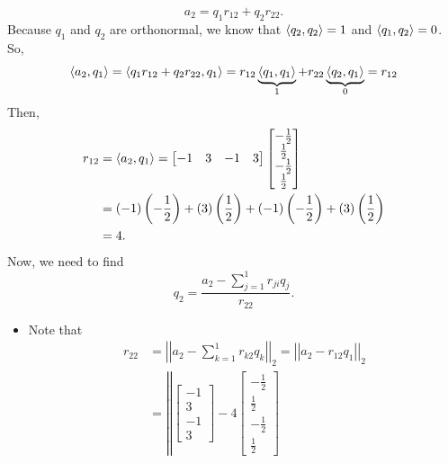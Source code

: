 \documentclass[letterpaper]{article}
\begin{document}
\begin{mdframed}
    \begin{mdframed}
        \[a_2 = q_1 r_{12} + q_2 r_{22}.\]
        Because $q_1$ and $q_2$ are orthonormal, we know that $\langle q_2, q_2 \rangle = 1$ and $\langle q_1, q_2 \rangle = 0$. So, \[\langle a_2, q_1 \rangle = \langle q_1 r_{12} + q_2 r_{22}, q_1 \rangle = r_{12} \underbrace{\langle q_1, q_1 \rangle}_{1} + r_{22} \underbrace{\langle q_2, q_1 \rangle}_{0} = r_{12}\]
        Then, 
        \begin{equation*}
            \begin{aligned}
                r_{12} &= \langle a_{2}, q_{1} \rangle= \begin{bmatrix}
                        -1 & 3 & -1 & 3
                    \end{bmatrix} \begin{bmatrix}
                        -\frac{1}{2} \\ \frac{1}{2} \\ -\frac{1}{2} \\ \frac{1}{2}
                    \end{bmatrix} \\ 
                    &= (-1) \left(-\frac{1}{2}\right) + (3) \left(\frac{1}{2}\right) + (-1)\left(-\frac{1}{2}\right) + (3)\left(\frac{1}{2}\right) \\ 
                    &= 4.
            \end{aligned}
        \end{equation*}
        Now, we need to find 
        \[q_2 = \frac{a_2 - \sum_{j = 1}^{1} r_{ji}q_j}{r_{22}}.\]
        \begin{itemize}
            \item Note that 
            \begin{equation*}
                \begin{aligned}
                    r_{22} &= \left|\left| a_2 - \sum_{k = 1}^{1} r_{k2} q_k \right|\right|_2 = \left|\left| a_2 - r_{12} q_1 \right|\right|_2 \\ 
                        &= \left|\left| \begin{bmatrix}
                            -1 \\ 3 \\ -1 \\ 3
                        \end{bmatrix} - 4 \begin{bmatrix}
                            -\frac{1}{2} \\ \frac{1}{2} \\ -\frac{1}{2} \\ \frac{1}{2}

\end{bmatrix}
\end{aligned}
\end{equation*}
\end{itemize}
\end{mdframed}
\end{mdframed}
\end{document}
